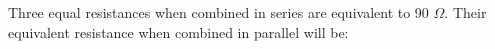 Three equal resistances when combined in series 
are equivalent to 90 $\Omega$. Their equivalent resistance when
combined in parallel will be: